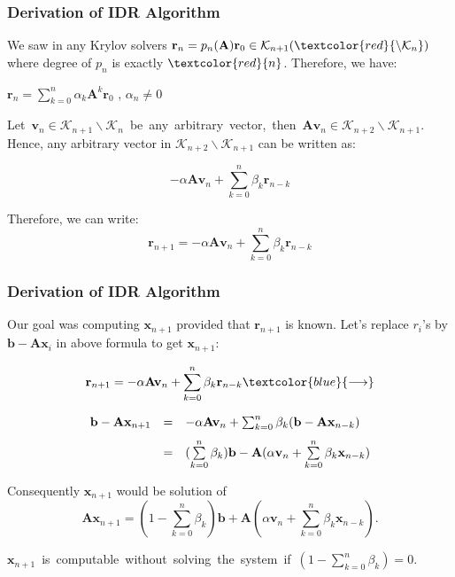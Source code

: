 \documentclass[mathserif]{beamer}
\begin{document}
\begin{frame}
\frametitle{Derivation of IDR Algorithm}

We saw in any Krylov solvers $\mathbf{r}_n=p_n(\mathbf{A})\mathbf{r}_0 \in \mathcal{K}_{n+1}(\textcolor{red} {\backslash \mathcal{K}_n})$ where degree of $p_n$ is exactly $\textcolor{red}{n}$. 
\pause
Therefore, we have:\\

\begin{center} $\mathbf{r}_n=\textstyle{\sum\limits _{k=0}^{n}} \alpha_k \mathbf{A}^{k}\mathbf{r}_0$ , $\alpha_n \ne 0$ \end{center}

\pause
\mbox{Let $\mathbf{v}_n \in \mathcal{K}_{n+1} \backslash \mathcal{K}_n$ be any arbitrary vector, then $\mathbf{A}\mathbf{v}_n \in \mathcal{K}_{n+2} \backslash \mathcal{K}_{n+1}$}.\\

\pause
Hence, any arbitrary vector in $\mathcal{K}_{n+2} \backslash \mathcal{K}_{n+1}$ can be written as:

\[ -\alpha \mathbf{A}\mathbf{v}_n+\sum\limits_{k=0}^{n} \beta_k \mathbf{r}_{n-k}  \]

\pause
Therefore, we can write:  \[\mathbf{r}_{n+1}=-\alpha \mathbf{A}\mathbf{v}_n+\sum\limits_{k=0}^{n} \beta_k \mathbf{r}_{n-k}\]
\end{frame}


\begin{frame}
\frametitle{Derivation of IDR Algorithm}
Our goal was computing $\mathbf{x}_{n+1}$ provided that $\mathbf{r}_{n+1}$ is known. Let's replace $r_i$'s by $\mathbf{b}-\mathbf{A}\mathbf{x}_i$ in above formula to get $\mathbf{x}_{n+1}$:

\pause
\[\mathbf{r}_{n+1}=-\alpha \mathbf{A}\mathbf{v}_n+\sum\limits_{k=0}^{n} \beta_k \mathbf{r}_{n-k} \textcolor{blue}{ \longrightarrow} \] 

\[\begin{array} {lclcl}  \mathbf{b}-\mathbf{A} \mathbf{x}_{n+1}&=& -\alpha \mathbf{A} \mathbf{v}_n + \sum_{k=0}^n \beta_k (\mathbf{b}-\mathbf{A} \mathbf{x}_{n-k})\nonumber \vspace{.1in} \\&=& (\sum \limits_{k=0}^n \beta_k)\mathbf{b}-\mathbf{A}(\alpha \mathbf{v}_n +\sum \limits_{k=0}^n \beta_k \mathbf{x}_{n-k})\end{array}\]

\pause
Consequently $\mathbf{x}_{n+1}$ would be solution of \[\mathbf{A} \mathbf{x}_{n+1} =(1- \sum_{k=0}^n \beta_k) \mathbf{b}+\mathbf{A}(\alpha \mathbf{v}_n+\sum_{k=0}^n \beta_k \mathbf{x}_{n-k}).\]

\pause
\mbox{$\mathbf{x}_{n+1}$ is computable without solving the system if $(1- \sum_{k=0}^n \beta_k)=0$.}
\end{frame}
\end{document}

